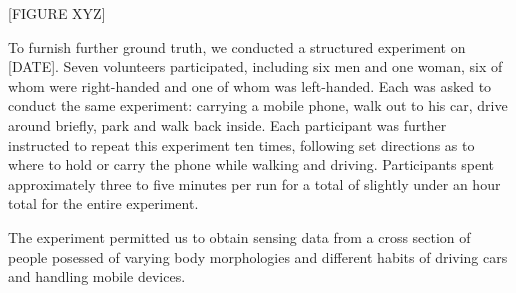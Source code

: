 

[FIGURE XYZ]

To furnish further ground truth, we conducted a structured experiment on
[DATE].  Seven volunteers participated, including six men and one woman, six
of whom were right-handed and one of whom was left-handed.  Each was asked to
conduct the same experiment:  carrying a mobile phone, walk out to his car,
drive around briefly, park and walk back inside.  Each participant was further
instructed to repeat this experiment ten times, following set directions as
to where to hold or carry the phone while walking and driving.  Participants
spent approximately three to five minutes per run for a total of slightly
under an hour total for the entire experiment.

The experiment permitted us to obtain sensing data from a cross section of
people posessed of varying body morphologies and different habits of driving
cars and handling mobile devices.



